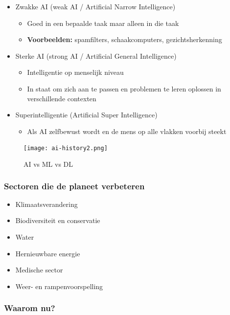 \documentclass{article}
\begin{document}
\begin{itemize}
    \item Zwakke AI (weak AI / Artificial Narrow Intelligence)
    \begin{itemize}
        \item Goed in een bepaalde taak maar alleen in die taak
        \item \textbf{Voorbeelden: } spamfilters, schaakcomputers, gezichtsherkenning
    \end{itemize}
    \item Sterke AI (strong AI / Artificial General Intelligence)
    \begin{itemize}
        \item Intelligentie op menselijk niveau
        \item In staat om zich aan te passen en problemen te leren oplossen in verschillende contexten
    \end{itemize}
    \item Superintelligentie (Artificial Super Intelligence)
    \begin{itemize}
        \item Als AI zelfbewust wordt en de mens op alle vlakken voorbij steekt
    \end{itemize}
\end{itemize}

\begin{figure}[H]
    \centering
    \texttt{[image: ai-history2.png]}
    \caption{AI vs ML vs DL}
\end{figure}

\subsubsection{Sectoren die de planeet verbeteren}

\begin{itemize}
    \item Klimaatsverandering
    \item Biodiversiteit en conservatie
    \item Water
    \item Hernieuwbare energie
    \item Medische sector
    \item Weer- en rampenvoorspelling
\end{itemize}

\subsubsection{Waarom nu?}
\end{document}
